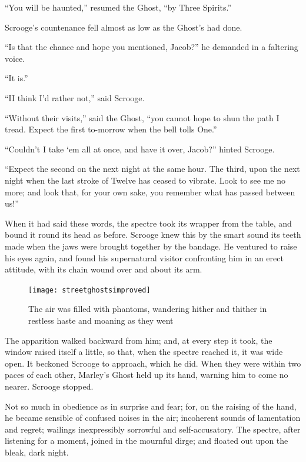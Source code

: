 \documentclass[paper=5.5in:8.5in,BCOR=10mm,twoside,DIV=15,12pt,usegeometry,openany]{scrbook} %
\begin{document}
\enquote{You will be haunted,} resumed the Ghost, \enquote{by Three Spirits.}




Scrooge's countenance fell almost as low as the Ghost's had done.

\enquote{Is that the chance and hope you mentioned, Jacob?} he demanded in a faltering voice.

\enquote{It is.}

\enquote{I\textemdash I think I'd rather not,} said Scrooge.

\enquote{Without their visits,} said the Ghost, \enquote{you cannot hope to shun the path I tread. Expect the first to-morrow when the bell tolls One.}

\enquote{Couldn't I take `em all at once, and have it over, Jacob?} hinted Scrooge.

\enquote{Expect the second on the next night at the same hour. The third, upon the next night when the last stroke of Twelve has ceased to vibrate. Look to see me no more; and look that, for your own sake, you remember what has passed between us!}

When it had said these words, the spectre took its wrapper from the table, and bound it round its head as before. Scrooge knew this by the smart sound its teeth made when the jaws were brought together by the bandage. He ventured to raise his eyes again, and found his supernatural visitor confronting him in an erect attitude, with its chain wound over and about its arm.

\begin{figure}[p]
\begin{minipage}[c]{\linewidth}
\texttt{[image: streetghostsimproved]}
\caption*{The air was filled with phantoms, wandering hither and thither in restless haste and moaning as they went}
\end{minipage}
\end{figure}

The apparition walked backward from him; and, at every step it took, the window raised itself a little, so that, when the spectre reached it, it was wide open. It beckoned Scrooge to approach, which he did. When they were within two paces of each other, Marley's Ghost held up its hand, warning him to come no nearer. Scrooge stopped.

Not so much in obedience as in surprise and fear; for, on the raising of the hand, he became sensible of confused noises in the air; incoherent sounds of lamentation and regret; wailings inexpressibly sorrowful and self-accusatory. The spectre, after listening for a moment, joined in the mournful dirge; and floated out upon the bleak, dark night.
\end{document}

